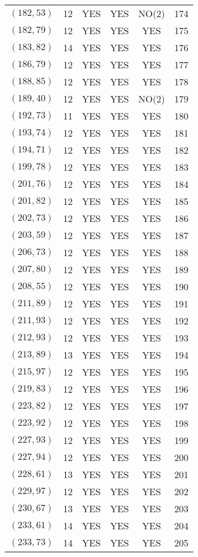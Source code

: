 \begin{longtable}{|c|c|c|c|c|c|}
$(182, 53)$ & 12 & YES & YES & NO(2) & 174\\
$(182, 79)$ & 12 & YES & YES & YES & 175\\
$(183, 82)$ & 14 & YES & YES & YES & 176\\
$(186, 79)$ & 12 & YES & YES & YES & 177\\
$(188, 85)$ & 12 & YES & YES & YES & 178\\
$(189, 40)$ & 12 & YES & YES & NO(2) & 179\\
$(192, 73)$ & 11 & YES & YES & YES & 180\\
$(193, 74)$ & 12 & YES & YES & YES & 181\\
$(194, 71)$ & 12 & YES & YES & YES & 182\\
$(199, 78)$ & 12 & YES & YES & YES & 183\\
$(201, 76)$ & 12 & YES & YES & YES & 184\\
$(201, 82)$ & 12 & YES & YES & YES & 185\\
$(202, 73)$ & 12 & YES & YES & YES & 186\\
$(203, 59)$ & 12 & YES & YES & YES & 187\\
$(206, 73)$ & 12 & YES & YES & YES & 188\\
$(207, 80)$ & 12 & YES & YES & YES & 189\\
$(208, 55)$ & 12 & YES & YES & YES & 190\\
$(211, 89)$ & 12 & YES & YES & YES & 191\\
$(211, 93)$ & 12 & YES & YES & YES & 192\\
$(212, 93)$ & 12 & YES & YES & YES & 193\\
$(213, 89)$ & 13 & YES & YES & YES & 194\\
$(215, 97)$ & 12 & YES & YES & YES & 195\\
$(219, 83)$ & 12 & YES & YES & YES & 196\\
$(223, 82)$ & 12 & YES & YES & YES & 197\\
$(223, 92)$ & 12 & YES & YES & YES & 198\\
$(227, 93)$ & 12 & YES & YES & YES & 199\\
$(227, 94)$ & 12 & YES & YES & YES & 200\\
$(228, 61)$ & 13 & YES & YES & YES & 201\\
$(229, 97)$ & 12 & YES & YES & YES & 202\\
$(230, 67)$ & 13 & YES & YES & YES & 203\\
$(233, 61)$ & 14 & YES & YES & YES & 204\\
$(233, 73)$ & 14 & YES & YES & YES & 205\\

\end{longtable}
